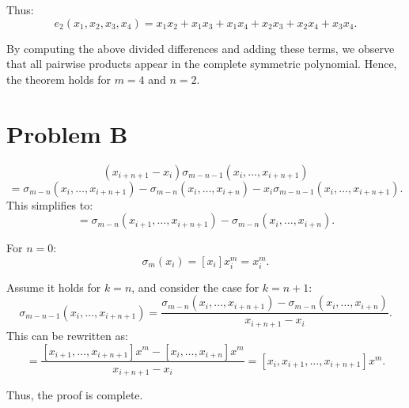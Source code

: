\documentclass{article}
\begin{document}
Thus:
\[
e_2(x_1, x_2, x_3, x_4) = x_1x_2 + x_1x_3 + x_1x_4 + x_2x_3 + x_2x_4 + x_3x_4.
\]

By computing the above divided differences and adding these terms, we observe that all pairwise products appear in the complete symmetric polynomial. Hence, the theorem holds for \( m = 4 \) and \( n = 2 \).

\section{ Problem B}
\[
(x_{i+n+1} - x_i) \sigma_{m-n-1}(x_i, \dots, x_{i+n+1})
\]
\[
= \sigma_{m-n}(x_i, \dots, x_{i+n+1}) - \sigma_{m-n}(x_i, \dots, x_{i+n}) - x_i \sigma_{m-n-1}(x_i, \dots, x_{i+n+1}).
\]
This simplifies to:
\[
= \sigma_{m-n}(x_{i+1}, \dots, x_{i+n+1}) - \sigma_{m-n}(x_i, \dots, x_{i+n}).
\]

For \( n = 0 \):
\[
\sigma_m(x_i) = [x_i] x_i^m = x_i^m.
\]

Assume it holds for \( k = n \), and consider the case for \( k = n + 1 \):
\[
\sigma_{m-n-1}(x_i, \dots, x_{i+n+1}) = \frac{\sigma_{m-n}(x_i, \dots, x_{i+n+1}) - \sigma_{m-n}(x_i, \dots, x_{i+n})}{x_{i+n+1} - x_i}.
\]
This can be rewritten as:
\[
= \frac{[x_{i+1}, \dots, x_{i+n+1}] x^m - [x_i, \dots, x_{i+n}] x^m}{x_{i+n+1} - x_i} = [x_i, x_{i+1}, \dots, x_{i+n+1}] x^m.
\]

Thus, the proof is complete.
\end{document}
